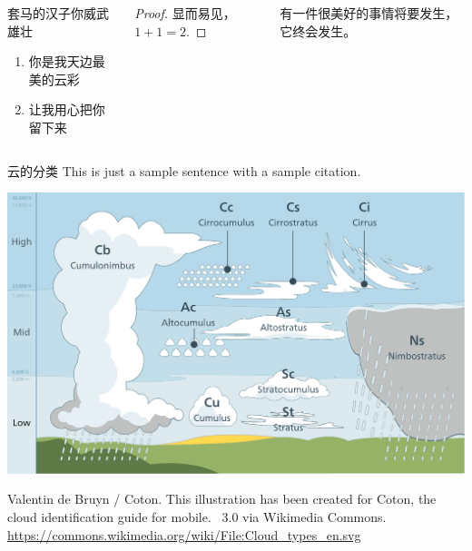 \documentclass[t,linespread=1.3]{ctexbeamer}
\begin{document}
\begin{frame}[fragile]
\begin{columns}[T]
\begin{block}{套马的汉子你威武雄壮}
  \begin{enumerate}
      \item 你是我天边最美的云彩
      \item 让我用心把你留下来
  \end{enumerate}
\end{block}

\begin{proof}
    显而易见，$1+1=2$.
\end{proof}

\begin{theorem}
    有一件很美好的事情将要发生，它终会发生。
\end{theorem}

\end{columns}

\begin{block}{云的分类}
This is just a sample sentence with a sample citation\cite{BurroughsCrowder2007}.

\smallskip 
\includegraphics[width=.6\textwidth]{Cloud_types_en}\par
Valentin de Bruyn / Coton. This illustration has been created for Coton, the cloud identification guide for mobile. \ccbysa\ 3.0 via Wikimedia Commons. \url{https://commons.wikimedia.org/wiki/File:Cloud_types_en.svg}
\end{block}

\vfill

\begin{block}{\refname}
\printbibliography[heading=none]
\end{block}

\end{frame}
\end{document}
